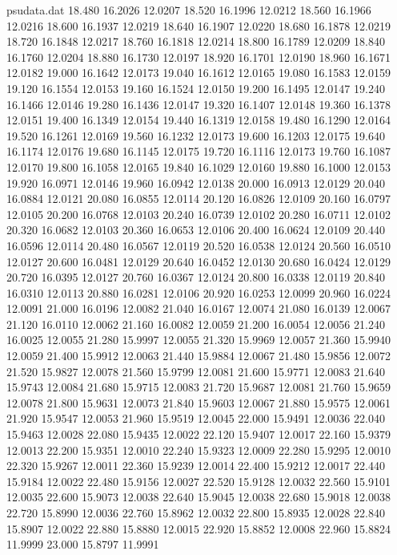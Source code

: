 \begin{filecontents*}{psudata.dat}
18.480 16.2026 12.0207
18.520 16.1996 12.0212
18.560 16.1966 12.0216
18.600 16.1937 12.0219
18.640 16.1907 12.0220
18.680 16.1878 12.0219
18.720 16.1848 12.0217
18.760 16.1818 12.0214
18.800 16.1789 12.0209
18.840 16.1760 12.0204
18.880 16.1730 12.0197
18.920 16.1701 12.0190
18.960 16.1671 12.0182
19.000 16.1642 12.0173
19.040 16.1612 12.0165
19.080 16.1583 12.0159
19.120 16.1554 12.0153
19.160 16.1524 12.0150
19.200 16.1495 12.0147
19.240 16.1466 12.0146
19.280 16.1436 12.0147
19.320 16.1407 12.0148
19.360 16.1378 12.0151
19.400 16.1349 12.0154
19.440 16.1319 12.0158
19.480 16.1290 12.0164
19.520 16.1261 12.0169
19.560 16.1232 12.0173
19.600 16.1203 12.0175
19.640 16.1174 12.0176
19.680 16.1145 12.0175
19.720 16.1116 12.0173
19.760 16.1087 12.0170
19.800 16.1058 12.0165
19.840 16.1029 12.0160
19.880 16.1000 12.0153
19.920 16.0971 12.0146
19.960 16.0942 12.0138
20.000 16.0913 12.0129
20.040 16.0884 12.0121
20.080 16.0855 12.0114
20.120 16.0826 12.0109
20.160 16.0797 12.0105
20.200 16.0768 12.0103
20.240 16.0739 12.0102
20.280 16.0711 12.0102
20.320 16.0682 12.0103
20.360 16.0653 12.0106
20.400 16.0624 12.0109
20.440 16.0596 12.0114
20.480 16.0567 12.0119
20.520 16.0538 12.0124
20.560 16.0510 12.0127
20.600 16.0481 12.0129
20.640 16.0452 12.0130
20.680 16.0424 12.0129
20.720 16.0395 12.0127
20.760 16.0367 12.0124
20.800 16.0338 12.0119
20.840 16.0310 12.0113
20.880 16.0281 12.0106
20.920 16.0253 12.0099
20.960 16.0224 12.0091
21.000 16.0196 12.0082
21.040 16.0167 12.0074
21.080 16.0139 12.0067
21.120 16.0110 12.0062
21.160 16.0082 12.0059
21.200 16.0054 12.0056
21.240 16.0025 12.0055
21.280 15.9997 12.0055
21.320 15.9969 12.0057
21.360 15.9940 12.0059
21.400 15.9912 12.0063
21.440 15.9884 12.0067
21.480 15.9856 12.0072
21.520 15.9827 12.0078
21.560 15.9799 12.0081
21.600 15.9771 12.0083
21.640 15.9743 12.0084
21.680 15.9715 12.0083
21.720 15.9687 12.0081
21.760 15.9659 12.0078
21.800 15.9631 12.0073
21.840 15.9603 12.0067
21.880 15.9575 12.0061
21.920 15.9547 12.0053
21.960 15.9519 12.0045
22.000 15.9491 12.0036
22.040 15.9463 12.0028
22.080 15.9435 12.0022
22.120 15.9407 12.0017
22.160 15.9379 12.0013
22.200 15.9351 12.0010
22.240 15.9323 12.0009
22.280 15.9295 12.0010
22.320 15.9267 12.0011
22.360 15.9239 12.0014
22.400 15.9212 12.0017
22.440 15.9184 12.0022
22.480 15.9156 12.0027
22.520 15.9128 12.0032
22.560 15.9101 12.0035
22.600 15.9073 12.0038
22.640 15.9045 12.0038
22.680 15.9018 12.0038
22.720 15.8990 12.0036
22.760 15.8962 12.0032
22.800 15.8935 12.0028
22.840 15.8907 12.0022
22.880 15.8880 12.0015
22.920 15.8852 12.0008
22.960 15.8824 11.9999
23.000 15.8797 11.9991

\end{filecontents*}

